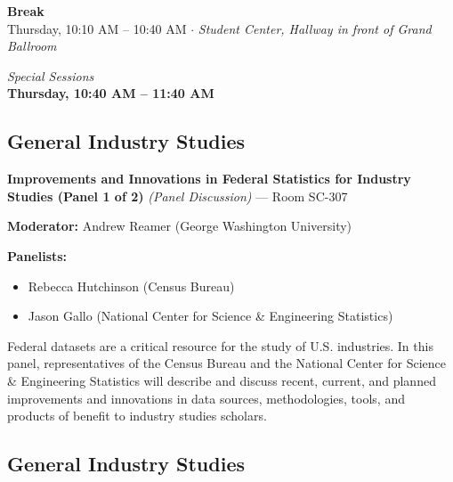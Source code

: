 \documentclass[
  10pt,
  letterpaper,
  DIV=11,
  numbers=noendperiod]{scrartcl}
\providecommand{\tightlist}{%
  \setlength{\itemsep}{0pt}\setlength{\parskip}{0pt}}\usepackage{longtable,booktabs,array}
\begin{document}
\vspace{1em}


\begin{center}
\colorbox{event!15}{\parbox{0.9\linewidth}{\centering
  \textcolor{event}{\large\textbf{Break}}\\[2pt]
  {\small Thursday, 10:10 AM – 10:40 AM $\cdot$ \textit{Student Center, Hallway in front of Grand Ballroom}}
}}
\end{center}

\vspace{1em}


\begin{center}
\normalsize\textit{Special Sessions}\\[0.3em]
\Large\textbf{Thursday, 10:40 AM – 11:40 AM}
\end{center}

\subsection{\texorpdfstring{\textcolor{gis}{General Industry Studies}}{}}\label{section-28}

\textbf{Improvements and Innovations in Federal Statistics for Industry
Studies (Panel 1 of 2)} \emph{(Panel Discussion)} --- Room SC-307

\textbf{Moderator:} Andrew Reamer (George Washington University)

\textbf{Panelists:}

\begin{itemize}
\tightlist
\item
  Rebecca Hutchinson (Census Bureau)
\item
  Jason Gallo (National Center for Science \& Engineering Statistics)
\end{itemize}

Federal datasets are a critical resource for the study of U.S.
industries. In this panel, representatives of the Census Bureau and the
National Center for Science \& Engineering Statistics will describe and
discuss recent, current, and planned improvements and innovations in
data sources, methodologies, tools, and products of benefit to industry
studies scholars.

\subsection{\texorpdfstring{\textcolor{gis}{General Industry Studies}}{}}\label{section-29}
\end{document}
